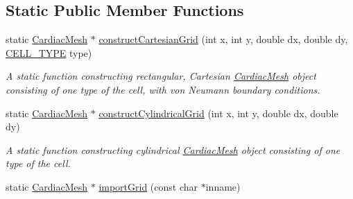 \subsection*{Static Public Member Functions}
\begin{DoxyCompactItemize}
\item 
static \hyperlink{class_cardiac_mesh}{Cardiac\+Mesh} $\ast$ \hyperlink{class_cardiac_mesh_a1b47716c2b8eee65b46d9cd47e7abb8e}{construct\+Cartesian\+Grid} (int x, int y, double dx, double dy, \hyperlink{heart_defines_8h_a2f059cd81f362503874790462d535f5b}{C\+E\+L\+L\+\_\+\+T\+Y\+P\+E} type)
\begin{DoxyCompactList}\small\item\em A static function constructing rectangular, Cartesian \hyperlink{class_cardiac_mesh}{Cardiac\+Mesh} object consisting of one type of the cell, with von Neumann boundary conditions. \end{DoxyCompactList}\item 
static \hyperlink{class_cardiac_mesh}{Cardiac\+Mesh} $\ast$ \hyperlink{class_cardiac_mesh_a706d5859f0b6d12d979ad6a102fc5f94}{construct\+Cylindrical\+Grid} (int x, int y, double dx, double dy)
\begin{DoxyCompactList}\small\item\em A static function constructing cylindrical \hyperlink{class_cardiac_mesh}{Cardiac\+Mesh} object consisting of one type of the cell. \end{DoxyCompactList}\item 
static \hyperlink{class_cardiac_mesh}{Cardiac\+Mesh} $\ast$ \hyperlink{class_cardiac_mesh_a85a7a7118237e9e2b238a4c3eb50fdc2}{import\+Grid} (const char $\ast$inname)
\end{DoxyCompactItemize}
